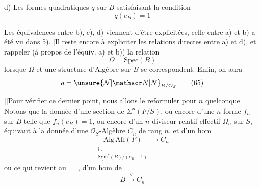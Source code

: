 \margin{\rule{0.35pt}{2.2\baselineskip}}d) Les formes quadratiques $q$ sur $B$ satisfaisant
la condition
\[
 q(e_B)=1 \tag*{(63)}
\]

Les équivalences entre b), c), d) viennent
d'être explicitées, celle entre a) et b) a
été vu dans 5). [Il reste encore à expliciter
les relations directes entre a) et d), et rappeler
(à propos de l'équiv. a) et b)) la relation
\[
\Omega=\mathrm{Spec}(B) \tag*{(64)}
\]
lorsque $\Omega$  et une structure d'Algèbre sur $B$
se correspondent. Enfin, on aura
\[
q=\unsure{\mathcal N|\mathscr N|N}_{B/\mathcal O_S} \tag*{(65)}
\]

[[Pour vérifier ce dernier point, nous allons le
reformuler pour $n$ quelconque. Notons que
la donnée d'une section de $\Sigma^n(F/S)$, ou
encore d'une $n$-forme $f_n$ sur $B$ telle que
$f_n(e_B)=1$, ou encore d'un $n$-diviseur relatif
effectif $\Omega_n$ sur $S$, équivaut à la donnée d'une
$\mathcal O_S$-Algèbre  $C_n$  de rang $n$, et d'un hom 
\[
\underset{\substack{\wr\downarrow\\\underline{\mathrm{Sym}}^*(B)/(e_B-1)}}{\underline{\mathrm{Alg\,Aff}}(F)}\longrightarrow C_n
\]
ou ce qui revient au $=$, d'un hom de 
\[
 B\xrightarrow{g} C_n \tag*{(66)}
\]

